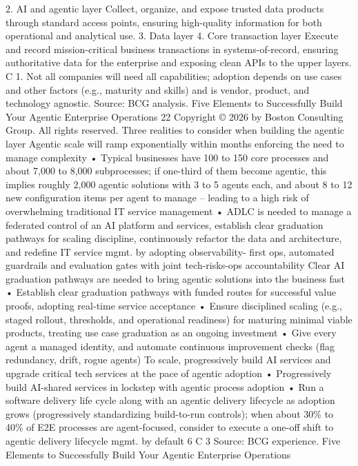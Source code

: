 2. AI and agentic layer
Collect, organize, and expose trusted data products through standard access points, ensuring high-quality
information for both operational and analytical use.
3. Data layer
4. Core transaction layer
Execute and record mission-critical business transactions in systems-of-record, ensuring authoritative data
for the enterprise and exposing clean APIs to the upper layers.
C
1. Not all companies will need all capabilities; adoption depends on use cases and other factors (e.g., maturity and skills) and is vendor, product, and technology agnostic. Source: BCG analysis.
Five Elements to Successfully Build Your Agentic Enterprise Operations
22
Copyright © 2026 by Boston Consulting Group. All rights reserved.
Three realities to consider when building the agentic layer
Agentic scale will ramp exponentially within months enforcing the need to manage complexity
• Typical businesses have 100 to 150 core processes and about 7,000 to 8,000 subprocesses; if one-third of them become
agentic, this implies roughly 2,000 agentic solutions with 3 to 5 agents each, and about 8 to 12 new configuration items per
agent to manage – leading to a high risk of overwhelming traditional IT service management
• ADLC is needed to manage a federated control of an AI platform and services, establish clear graduation pathways for
scaling discipline, continuously refactor the data and architecture, and redefine IT service mgmt. by adopting observability-
first ops, automated guardrails and evaluation gates with joint tech-risks-ops accountability
Clear AI graduation pathways are needed to bring agentic solutions into the business fast
• Establish clear graduation pathways with funded routes for successful value proofs, adopting real-time service acceptance
• Ensure disciplined scaling (e.g., staged rollout, thresholds, and operational readiness) for maturing minimal viable
products, treating use case graduation as an ongoing investment
• Give every agent a managed identity, and automate continuous improvement checks (flag redundancy, drift, rogue agents)
To scale, progressively build AI services and upgrade critical tech services at the pace of agentic adoption
• Progressively build AI-shared services in lockstep with agentic process adoption
• Run a software delivery life cycle along with an agentic delivery lifecycle as adoption grows (progressively standardizing
build-to-run controls); when about 30\% to 40\% of E2E processes are agent-focused, consider to execute a one-off shift to
agentic delivery lifecycle mgmt. by default
6
C
3
Source: BCG experience.
Five Elements to Successfully Build Your Agentic Enterprise Operations
